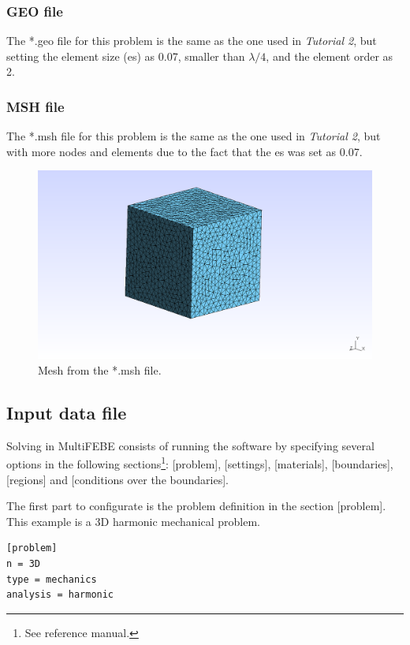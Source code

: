 \documentclass[a4]{article}
\begin{document}
\subsubsection{GEO file}
The *.geo file for this problem is the same as the one used in \emph{Tutorial 2}, but setting the element size (es) as 0.07, smaller than $\lambda/4$, and the element order as 2.

\subsubsection{MSH file}
The *.msh file for this problem is the same as the one used in \emph{Tutorial 2}, but with more nodes and elements due to the fact that the es was set as 0.07.

\begin{figure}[h]
	\centering
	\includegraphics[scale = 0.3]{mesh.png}
	\caption{Mesh from the *.msh file.}
	\label{fig:mesh}
\end{figure}

\subsection{Input data file}
Solving in MultiFEBE consists of running the software by specifying several options in the following sections\footnote{See reference manual.}: [problem], [settings], [materials], [boundaries], [regions] and [conditions over the boundaries].

The first part to configurate is the problem definition in the section [problem]. This example is a 3D harmonic mechanical problem.  

\begin{Verbatim}	
[problem]
n = 3D
type = mechanics
analysis = harmonic
\end{Verbatim}
\end{document}
